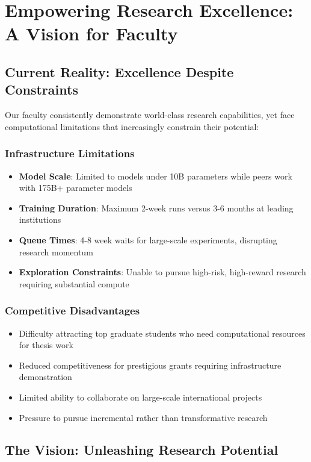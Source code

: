 \section{Empowering Research Excellence: A Vision for Faculty}

\subsection{Current Reality: Excellence Despite Constraints}

Our faculty consistently demonstrate world-class research capabilities, yet face computational limitations that increasingly constrain their potential:

\subsubsection{Infrastructure Limitations}
\begin{itemize}
\item \textbf{Model Scale}: Limited to models under 10B parameters while peers work with 175B+ parameter models
\item \textbf{Training Duration}: Maximum 2-week runs versus 3-6 months at leading institutions
\item \textbf{Queue Times}: 4-8 week waits for large-scale experiments, disrupting research momentum
\item \textbf{Exploration Constraints}: Unable to pursue high-risk, high-reward research requiring substantial compute
\end{itemize}

\subsubsection{Competitive Disadvantages}
\begin{itemize}
\item Difficulty attracting top graduate students who need computational resources for thesis work
\item Reduced competitiveness for prestigious grants requiring infrastructure demonstration
\item Limited ability to collaborate on large-scale international projects
\item Pressure to pursue incremental rather than transformative research
\end{itemize}

\subsection{The Vision: Unleashing Research Potential}

